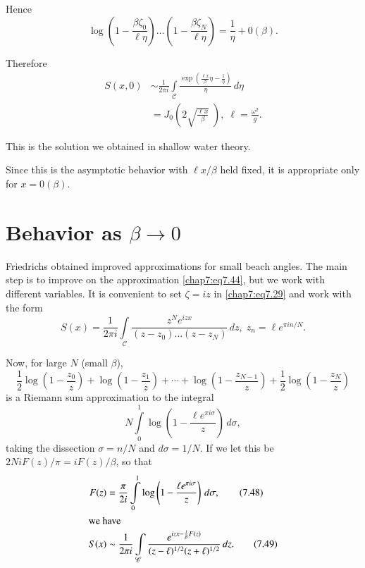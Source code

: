 {{Hence 
\begin{equation}
\log\left(1-\frac{\beta\zeta_0}{\ell\eta}\right)\ldots\left(1-\frac{\beta \zeta_N}{\ell\eta}\right)=\frac{1}{\eta}+0(\beta). \tag{7.44}\label{chap7:eq7.44}
\end{equation}

Therefore
\begin{equation}
\begin{aligned}
S(x,0) &\sim \frac{1}{2\pi i}\int\limits_{\mathscr{C}}\frac{\exp\left(\frac{\ell x}{\beta}\eta-\frac{1}{\eta}\right)}{\eta}\,d\eta\\
&= J_0\left(2 \sqrt{\frac{\ell x}{\beta}} \; \right),\;\ell=\frac{\omega^2}{g}. 
\end{aligned}\tag{7.45}\label{chap7:eq7.45}
\end{equation}

This is the solution we obtained in shallow water theory.

Since this is the asymptotic behavior with $\ell x/\beta$ held fixed, it is appropriate only for $x=0(\beta)$. 

\section{Behavior as $\beta\to 0$}\label{chap7:sec7.3}\pageoriginale

Friedrichs \cite{key12} obtained improved approximations for small beach angles. The main step is to improve on the approximation \eqref{chap7:eq7.44}, but we work with different variables. It is convenient to set $\zeta =iz$ in \eqref{chap7:eq7.29} and work with the form 
\begin{equation}
S(x)=\frac{1}{2\pi i}\int\limits_{\mathscr{C}}\frac{z^N e^{izx}} {\left(z-z_0\right)\ldots\left(z-z_N\right)}\,dz,\;z_n=\ell e^{\pi in/N}. \tag{7.46}\label{chap7:eq7.46}
\end{equation}

Now, for large $N$ (small $\beta$),
$$
\frac{1}{2}\log\left(1-\frac{z_0}{z}\right)+\log\left(1-\frac{z_1}{z}\right)+ \cdots+\log\left(1-\frac{z_{N-1}}{z}\right)+\frac{1}{2}\log \left(1-\frac{z_N}{z} \right)
$$
is a Riemann sum approximation to the integral
\begin{equation}
N\int\limits_0^1\log\left(1-\frac{\ell e^{\pi
    i\sigma}}{z}\right)\,d\sigma, \tag{7.47}\label{chap7:eq7.47} 
\end{equation}
taking the dissection $\sigma =n/N$ and $d\sigma =1/N$. If we let this
be\break $2NiF(z)/\pi=iF(z)/\beta$, so that  
\begin{align}
F(z) &= \frac{\pi}{2i}\int\limits_0^1\log\left(1-\frac{\ell e^{\pi i\sigma}}{z} \right)\,d\sigma,\tag{7.48}\label{chap7:eq7.48}\\
\intertext{we have}
S(x) &\sim \frac{1}{2\pi i}\int\limits_{\mathscr{C}}\frac{e^{izx-\frac{i}{\beta} F(z)}}{(z-\ell)^{1/2}(z+\ell)^{1/2}}\,dz.\tag{7.49}\label{chap7:eq7.49}
\end{align}

}}
